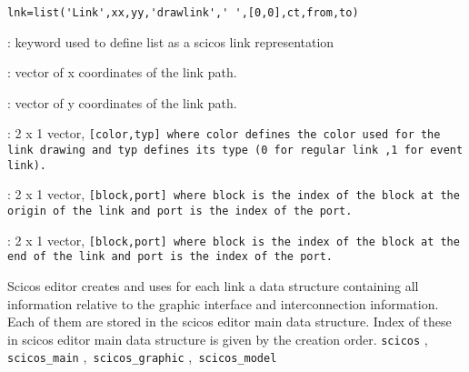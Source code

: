 \label{scicoslink}

\begin{verbatim}
lnk=list('Link',xx,yy,'drawlink',' ',[0,0],ct,from,to)
\end{verbatim}
\begin{scitem}
\item[{\verb?"Link"?}]
: keyword used to define list as a scicos link representation
\item[{\verb?xx?}]
: vector of x coordinates of the link path.
\item[{\verb?yy?}]
: vector of y coordinates of the link path.
\item[{\verb?ct?}]
: 2 x 1 vector, %
\tt [color,typ] %
\rm where %
\tt color %
\rm defines the color
used for the link drawing and %
\tt typ %
\rm defines its type (0 for
regular link ,1 for event link).
\item[{\verb?from?}]
: 2 x 1 vector, %
\tt [block,port] %
\rm where %
\tt block %
\rm is the index of
the block at the origin of the link and %
\tt port %
\rm is the index of the
port.
\item[{\verb?to?}]
: 2 x 1 vector, %
\tt [block,port] %
\rm where %
\tt block %
\rm is the index of
the block at the end of the link and %
\tt port %
\rm is the index of the
port.
\end{scitem}%
Scicos editor creates and uses for each link a data structure
containing all information relative to the graphic interface and
interconnection information. Each of them are stored in the scicos
editor main data structure. Index of these in scicos
editor main data structure is given by the creation order.
{\verb?scicos?} \pageref{scicos},{\verb? scicos_main?} \pageref{scicosmain},{\verb? scicos_graphic?} \pageref{scicosgraphic},{\verb? scicos_model?} \pageref{scicosmodel}





%
%


\label{scicoscpr}

